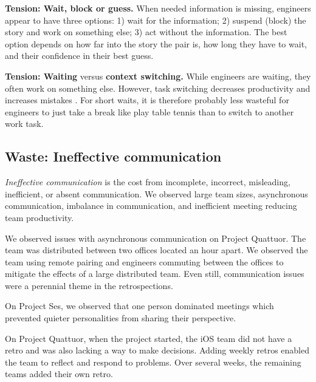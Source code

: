 \textbf{Tension: Wait, block or guess.}
When needed information is missing, engineers appear to have three options: 1) wait for the information; 2) suspend (block) the story and work on something else; 3) act without the information. The best option depends on how far into the story the pair is, how long they have to wait, and their confidence in their best guess.

\textbf{Tension: Waiting} versus \textbf{context switching.}
While engineers are waiting, they often work on something else. However, task switching decreases productivity and increases mistakes \cite{MonsellTaskSwitching}. For short waits, it is therefore probably less wasteful for engineers to just take a break like play table tennis than to switch to another work task. 

\subsection{Waste: Ineffective communication}
\textit{Ineffective communication} is the cost from incomplete, incorrect, misleading, inefficient, or absent communication. We observed large team sizes, asynchronous communication, imbalance in communication, and inefficient meeting reducing team productivity.

We observed issues with asynchronous communication on Project Quattuor. The team was distributed between two offices located an hour apart. We observed the team using remote pairing and engineers commuting between the offices to mitigate the effects of a large distributed team. Even still, communication issues were a perennial theme in the retrospections.


On Project Ses, we observed that one person dominated meetings which prevented quieter personalities from sharing their perspective. 

On Project Quattuor, when the project started, the iOS team did not have a retro and was also lacking a way to make decisions. Adding weekly retros enabled the team to reflect and respond to problems. Over several weeks, the remaining teams added their own retro. 


